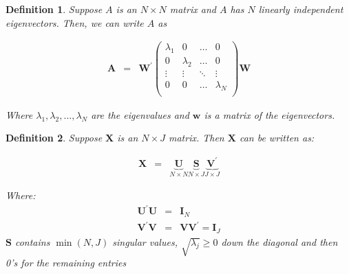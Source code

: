 \documentclass{beamer}
\newtheorem{defn}{Definition}
\numberwithin{equation}{section}
\begin{document}
\begin{frame}

\begin{defn}
Suppose $A$ is an $N \times N$ matrix and $A$ has $N$ linearly independent eigenvectors.  Then, we can write $A$ as

\begin{eqnarray}
\boldsymbol{A} &= & \boldsymbol{W}^{'}\begin{pmatrix}
\lambda_{1} & 0 & \hdots & 0 \\
0 & \lambda_{2} & \hdots & 0 \\
\vdots & \vdots & \ddots & \vdots \\
0 & 0&  \hdots & \lambda_{N}\\
\end{pmatrix}
\boldsymbol{W} \nonumber
\end{eqnarray}

Where $\lambda_{1},\lambda_{2} , \hdots , \lambda_{N} $ are the eigenvalues and $\boldsymbol{w}$ is a matrix of the eigenvectors. \\

\end{defn}

\end{frame}



\begin{frame}
\begin{defn}
Suppose $\boldsymbol{X}$ is an $N \times J$ matrix.  Then $\boldsymbol{X}$ can be written as:

\begin{eqnarray}
\boldsymbol{X} & =& \underbrace{\boldsymbol{U}}_{N \times N} \underbrace{\boldsymbol{S}}_{N \times J} \underbrace{\boldsymbol{V}^{'}}_{J \times J} \nonumber
\end{eqnarray}

Where:
\begin{eqnarray}
\boldsymbol{U}^{'}\boldsymbol{U} & = & \boldsymbol{I}_{N} \nonumber \\
\boldsymbol{V}^{'}\boldsymbol{V} & = & \boldsymbol{V}\boldsymbol{V}^{'} = \boldsymbol{I}_{J} \nonumber
\end{eqnarray}
$\boldsymbol{S}$ contains $\min(N, J)$ singular values, $\sqrt{\lambda_{j}}\geq 0$ down the diagonal and then 0's for the remaining entries
\end{defn}


\end{frame}
\end{document}

